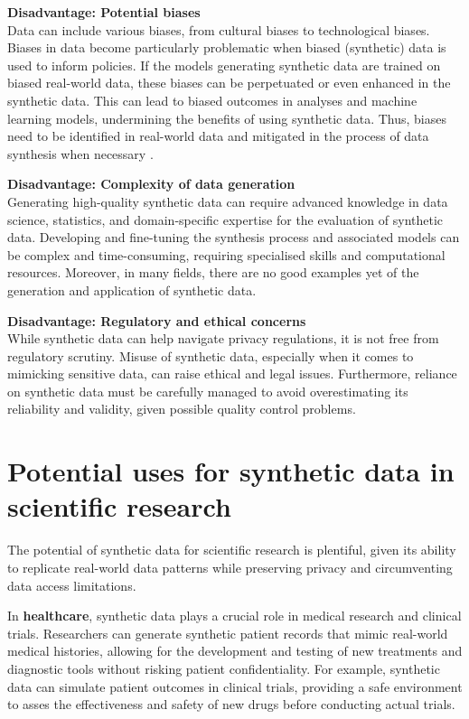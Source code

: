 \textbf{Disadvantage: Potential biases}\\
Data can include various biases, from cultural biases to technological biases. Biases in data become particularly problematic when biased (synthetic) data is used to inform policies. If the models generating synthetic data are trained on biased real-world data, these biases can be perpetuated or even enhanced in the synthetic data. This can lead to biased outcomes in analyses and machine learning models, undermining the benefits of using synthetic data. Thus, biases need to be identified in real-world data and mitigated in the process of data synthesis when necessary \cite{barbierato2022methodology}.

\textbf{Disadvantage: Complexity of data generation}\\
Generating high-quality synthetic data can require advanced knowledge in data science, statistics, and domain-specific expertise for the evaluation of synthetic data. Developing and fine-tuning the synthesis process and associated models can be complex and time-consuming, requiring specialised skills and computational resources. Moreover, in many fields, there are no good examples yet of the generation and application of synthetic data.

\textbf{Disadvantage: Regulatory and ethical concerns}\\
While synthetic data can help navigate privacy regulations, it is not free from regulatory scrutiny. Misuse of synthetic data, especially when it comes to mimicking sensitive data, can raise ethical and legal issues. Furthermore, reliance on synthetic data must be carefully managed to avoid overestimating its reliability and validity, given possible quality control problems. 


\section{Potential uses for synthetic data in scientific research}

The potential of synthetic data for scientific research is plentiful, given its ability to replicate real-world data patterns while preserving privacy and circumventing data access limitations.

In \textbf{healthcare}, synthetic data plays a crucial role in medical research and clinical trials. Researchers can generate synthetic patient records that mimic real-world medical histories, allowing for the development and testing of new treatments and diagnostic tools without risking patient confidentiality. For example, synthetic data can simulate patient outcomes in clinical trials, providing a safe environment to asses the effectiveness and safety of new drugs before conducting actual trials. \cite{gonzales2023synthetic,arora2022generative,braddon2023exploring}

